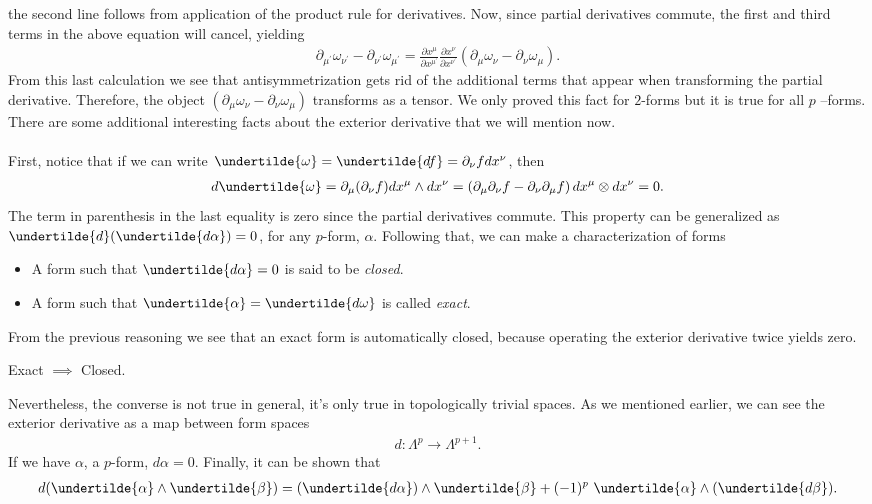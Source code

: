 \documentclass[10pt]{article}
\begin{document}
	the second line follows from application of the product rule for derivatives. Now, since partial derivatives commute, the first and third terms in the above equation will cancel, yielding
	\begin{align}
	\partial_{\mu^{\prime}}\omega_{\nu^{\prime}}-\partial_{\nu^{\prime}}\omega_{\mu^{\prime}}=\frac{\partial x^{\mu}}{\partial x^{\mu^{\prime}}}\frac{\partial x^{\nu}}{\partial x^{\nu^{\prime}}}\left(\partial_{\mu} \omega_{\nu}-\partial_{\nu}\omega_{\mu}\right).
	\end{align}
	From this last calculation we see that antisymmetrization gets rid of the additional terms that appear when transforming the partial derivative. Therefore, the object $(\partial_{\mu}\omega_{\nu}-\partial_{\nu}\omega_{\mu})$ transforms as a tensor. We only proved this fact for $2$-forms but it is true for all $p$ --forms. There are some additional interesting facts about the exterior derivative that we will mention now.\\\\
	First, notice that if we can write $\undertilde{\omega}=\undertilde{df}=\partial_{\nu}fdx^{\nu}$, then 
	\begin{align}
	d\undertilde{\omega}=\partial_{\mu}(\partial_{\nu}f) dx^{\mu}\wedge dx^{\nu}=\left( \partial_{\mu}\partial_{\nu}f-\partial_{\nu}\partial_{\mu} f\right)dx^{\mu}\otimes dx^{\nu}=0.
	\end{align}	
	The term in parenthesis in the last equality is zero since the partial derivatives commute. This property can be generalized as $\undertilde{d}(\undertilde{d \alpha})=0$, for any $p$-form, $\alpha$. Following that, we can make a characterization of forms
	\begin{itemize}
	\item A form such that $\undertilde{d \alpha}=0$ is said to be \textit{closed}.
	\item A form such that $\undertilde{\alpha}=\undertilde{d \omega}$ is called \textit{exact}.
	\end{itemize} 	
	From the previous reasoning we see that an exact form is automatically closed, because operating the exterior derivative twice yields zero. 
	\begin{center}
	Exact $\implies$ Closed.
	\end{center}
	Nevertheless, the converse is not true in general, it's only true in topologically trivial spaces.
	As we mentioned earlier, we can see the exterior derivative as a map between form spaces
	\begin{align}
	d: \Lambda^p \longrightarrow \Lambda^{p+1}.
	\end{align}
	If we have $\alpha$, a $p$-form, $d \alpha=0$. Finally, it can be shown that 
	\begin{align}
	d(\undertilde{\alpha}\wedge\undertilde{\beta})=(\undertilde{d\alpha})\wedge \undertilde{\beta}+(-1)^p~\undertilde{\alpha}\wedge(\undertilde{d \beta}).
	\end{align}
\end{document}
